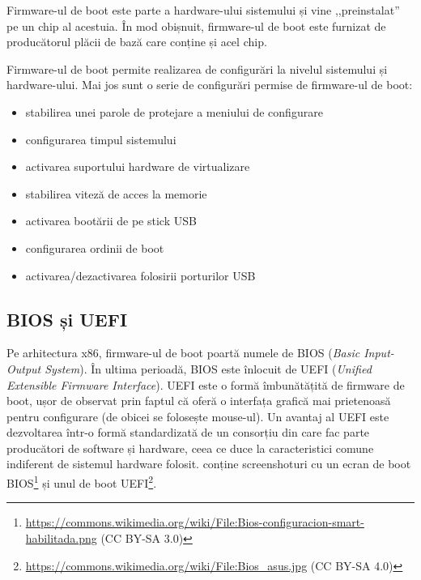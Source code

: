 Firmware-ul de boot este parte a hardware-ului sistemului și vine ,,preinstalat''
pe un chip al acestuia. În mod obișnuit, firmware-ul de boot este furnizat de
producătorul plăcii de bază care conține și acel chip.

Firmware-ul de boot permite realizarea de configurări la nivelul sistemului și
hardware-ului. Mai jos sunt o serie de configurări permise de firmware-ul de
boot:

\begin{itemize}
	\item stabilirea unei parole de protejare a meniului de configurare
	\item configurarea timpul sistemului
	\item activarea suportului hardware de virtualizare
	\item stabilirea viteză de acces la memorie
	\item activarea bootării de pe stick USB
	\item configurarea ordinii de boot
	\item activarea/dezactivarea folosirii porturilor USB
\end{itemize}

\subsection{BIOS și UEFI}
\label{sec:boot:firmware:bios-uefi}

Pe arhitectura x86, firmware-ul de boot poartă numele de BIOS (\textit{Basic
Input-Output System}). În ultima perioadă, BIOS este înlocuit de UEFI
(\textit{Unified Extensible Firmware Interface}). UEFI este o formă îmbunătățită de
firmware de boot, ușor de observat prin faptul că oferă o interfața grafică mai prietenoasă pentru configurare (de obicei se
folosește mouse-ul). Un avantaj al UEFI este dezvoltarea într-o formă
standardizată de un consorțiu din care fac parte producători de software și
hardware, ceea ce duce la caracteristici comune indiferent de sistemul hardware
folosit.  conține screenshoturi cu un ecran de boot BIOS\footnote{\url{https://commons.wikimedia.org/wiki/File:Bios-configuracion-smart-habilitada.png} (CC BY-SA 3.0)} și unul de boot
UEFI\footnote{\url{https://commons.wikimedia.org/wiki/File:Bios\_asus.jpg} (CC BY-SA 4.0)}.

